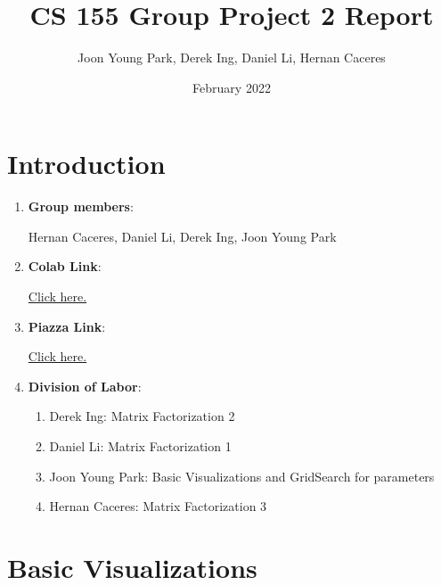 \documentclass{article}
\title{CS 155 Group Project 2 Report}
\author{Joon Young Park, Derek Ing, Daniel Li, Hernan Caceres}
\date{February 2022}
\begin{document}
\maketitle

\section{Introduction}

\begin{enumerate}
    \item \textbf{Group members}:
    \vspace{2mm} 
    
    Hernan Caceres, Daniel Li, Derek Ing, Joon Young Park
    
    \item \textbf{Colab Link}:
    \vspace{1.5mm} 
    
    \href{https://colab.research.google.com/drive/1R8D9uk7o5qWmJ62WFXMZSglOFGF19Hun?usp=sharing}{ 
Click here.}
    
    \item \textbf{Piazza Link}:
    \vspace{1.5mm} 
    
    \href{https://piazza.com/class/kxhtyed0nmh2s?cid=392}{ 
Click here.} 
    
    \item \textbf{Division of Labor}:
    \vspace{1.5mm} 
    
    \begin{enumerate}

        \item Derek Ing: Matrix Factorization 2
        
        \item Daniel Li: Matrix Factorization 1
        
        \item Joon Young Park: Basic Visualizations and GridSearch for parameters
        
        \item Hernan Caceres: Matrix Factorization 3
    \end{enumerate}
\end{enumerate}

\newpage

\section{Basic Visualizations}
\end{document}
